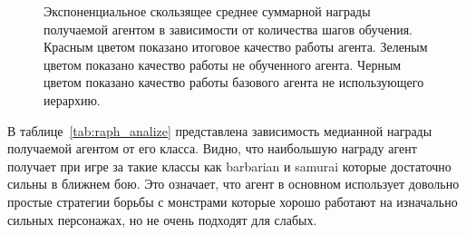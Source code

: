 \begin{figure}[ht]
\caption{Экспоненциальное скользящее среднее суммарной награды получаемой агентом в зависимости от количества шагов обучения. Красным цветом показано итоговое качество работы агента. Зеленым цветом показано качество работы не обученного агента. Черным цветом показано качество работы базового агента не использующего иерархию.}
    \label{fig:raph_train}
\end{figure}


В таблице~\ref{tab:raph_analize} представлена зависимость медианной награды получаемой агентом от его класса. Видно, что наибольшую награду агент получает при игре за такие классы как barbarian и samurai которые достаточно сильны в ближнем бою. Это означает, что агент в основном использует довольно простые стратегии борьбы с монстрами которые хорошо работают на изначально сильных персонажах, но не очень подходят для слабых. 

